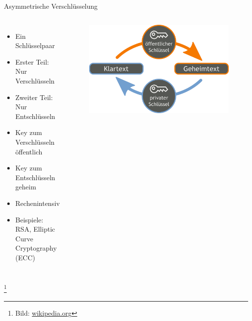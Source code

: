 \documentclass[10pt]{beamer}
\newcommand\blfootnote[1]{%
	\begingroup
	\renewcommand\thefootnote{}\footnote{#1}%
	\addtocounter{footnote}{-1}%
	\endgroup
}
\begin{document}
%
%
\begin{frame}[fragile]{Asymmetrische Verschlüsselung}
\begin{columns}[T,c,onlytextwidth]
	\begin{itemize}
		\item Ein Schlüsselpaar
		\item Erster Teil: Nur Verschlüsseln
		\item Zweiter Teil: Nur Entschlüsseln
		\item Key zum Verschlüsseln öffentlich
		\item Key zum Entschlüsseln geheim
		\item Rechenintensiv
		\item Beispiele: RSA, Elliptic Curve Cryptography (ECC)
	\end{itemize}
	\begin{figure}
		\includegraphics[width=1\textwidth]{images/asym}
	\end{figure}
\end{columns}
\blfootnote{Bild: \href{https://de.wikipedia.org/wiki/Asymmetrisches_Kryptosystem}{wikipedia.org}}
\end{frame}
\end{document}
